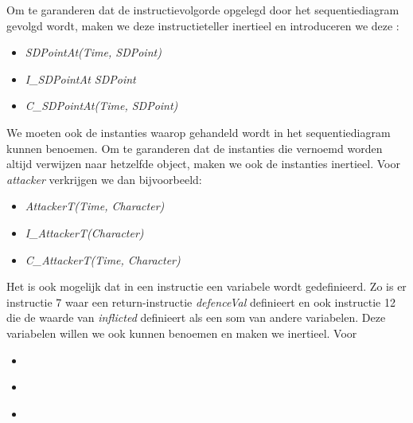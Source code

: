 Om te garanderen dat de instructievolgorde opgelegd door het sequentiediagram gevolgd wordt, maken we deze instructieteller inertieel en introduceren we deze \DIFdelbegin {}\DIFdelend \DIFaddbegin {}\DIFaddend :

\begin{itemize}
	\item \DIFaddbegin {}\DIFaddend \textit{SDPointAt(Time, SDPoint)}
	\item \DIFaddbegin {}\DIFaddend \textit{I\_SDPointAt\DIFdelbegin %
\DIFdelend \DIFaddbegin \DIFadd{(}\DIFaddend SDPoint\DIFdelbegin %
\DIFdelend \DIFaddbegin \DIFadd{)}\DIFaddend }
	\item \DIFaddbegin {}\DIFaddend \textit{C\_SDPointAt(Time, SDPoint)}
\end{itemize}

We moeten ook de instanties waarop gehandeld wordt in het sequentiediagram kunnen benoemen. Om te garanderen dat de instanties die vernoemd worden altijd verwijzen naar hetzelfde object, maken we ook de instanties inertieel. Voor \textit{attacker} verkrijgen we dan bijvoorbeeld:

\begin{itemize}
	\item \textit{AttackerT(Time, Character)}
	\item \textit{I\_AttackerT(Character)}
	\item \textit{C\_AttackerT(Time, Character)}
\end{itemize}

Het is ook mogelijk dat in een instructie een variabele \DIFaddbegin {}\DIFaddend wordt gedefinieerd. Zo is er instructie 7 waar een return-instructie \textit{defenceVal} definieert en ook instructie 12 die de waarde van \textit{inflicted} definieert als een som van andere variabelen. Deze variabelen willen we ook kunnen benoemen en maken we inertieel. Voor \DIFdelbegin \textit{} %
\DIFdelend \DIFaddbegin {}\textit{}\DIFaddend 

\DIFdelbegin %
\begin{itemize}%
\item%
\textit{}
\item%
\textit{%
}
\item%
\textit{}

\end{itemize}%

